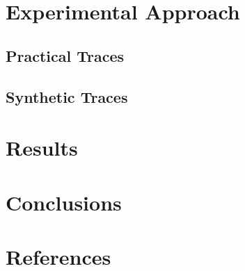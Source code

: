 \documentclass{article}
\begin{document}
	\section{Experimental Approach}
	\subsection{Practical Traces}
	
	\subsection{Synthetic Traces}
	
	\section{Results}

	\section{Conclusions}

	\section{References}

	
\end{document}
